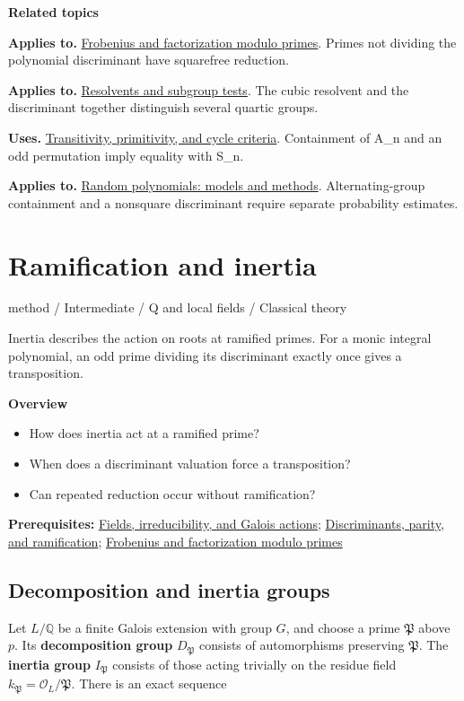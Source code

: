 \documentclass[11pt,a4paper,oneside,openany]{book}
\begin{document}
\par\medskip\begingroup\footnotesize\setlength{\parskip}{1pt}\textbf{\sffamily\color{atlasgreen}Related topics}\par
\color{black}\textbf{Applies to.} \hyperlink{article:frobenius}{Frobenius and factorization modulo primes}. Primes not dividing the polynomial discriminant have squarefree reduction.\par
\color{black}\textbf{Applies to.} \hyperlink{article:resolvents}{Resolvents and subgroup tests}. The cubic resolvent and the discriminant together distinguish several quartic groups.\par
\color{black}\textbf{Uses.} \hyperlink{article:permutation-groups}{Transitivity, primitivity, and cycle criteria}. Containment of A\_\allowbreak{}n and an odd permutation imply equality with S\_\allowbreak{}n.\par
\color{black}\textbf{Applies to.} \hyperlink{article:random-models}{Random polynomials: models and methods}. Alternating-group containment and a nonsquare discriminant require separate probability estimates.\par
\endgroup
\chapter{Ramification and inertia}\label{article:ramification-inertia}\hypertarget{article:ramification-inertia}{}\color{black}
{\sffamily\small\color{atlasgold}method / Intermediate / Q and local fields / Classical theory}\par\medskip
Inertia describes the action on roots at ramified primes. For a monic integral polynomial, an odd prime dividing its discriminant exactly once gives a transposition.\par\medskip
\textbf{Overview}\begin{itemize}
\item How does inertia act at a ramified prime?
\item When does a discriminant valuation force a transposition?
\item Can repeated reduction occur without ramification?
\end{itemize}
{\small\textbf{Prerequisites:} \hyperlink{article:foundations}{Fields, irreducibility, and Galois actions}; \hyperlink{article:discriminants}{Discriminants, parity, and ramification}; \hyperlink{article:frobenius}{Frobenius and factorization modulo primes}}\par
{}\section{Decomposition and inertia groups}
\color{black} Let \(L/\mathbb Q\) be a finite Galois extension with group \(G\), and choose a prime \(\mathfrak P\) above \(p\). Its \textbf{decomposition group} \(D_{\mathfrak P}\) consists of automorphisms preserving \(\mathfrak P\). The \textbf{inertia group} \(I_{\mathfrak P}\) consists of those acting trivially on the residue field \(k_{\mathfrak P}=\mathcal O_L/\mathfrak P\). There is an exact sequence\par
\end{document}
